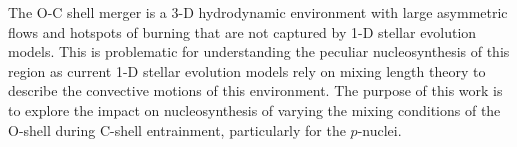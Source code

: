 The O-C shell merger is a 3-D hydrodynamic environment with large asymmetric flows and hotspots of burning that are not captured by 1-D stellar evolution models.
This is problematic for understanding the peculiar nucleosynthesis of this region as current 1-D stellar evolution models rely on mixing length theory to describe the convective motions of this environment.
The purpose of this work is to explore the impact on nucleosynthesis of varying the mixing conditions of the O-shell during C-shell entrainment, particularly for the $p$-nuclei.